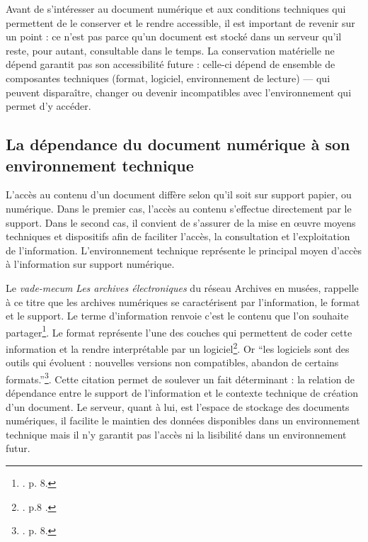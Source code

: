 Avant de s’intéresser au document numérique et aux conditions techniques qui permettent de le conserver et le rendre accessible, il est important de revenir sur un point : ce n'est pas parce qu'un document est stocké dans un serveur qu'il reste, pour autant, consultable dans le temps. La conservation matérielle ne dépend garantit pas son accessibilité future : celle-ci dépend de ensemble de composantes techniques (format, logiciel, environnement de lecture) — qui peuvent disparaître, changer ou devenir incompatibles avec l'environnement qui permet d'y accéder. 

\subsection*{La dépendance du document numérique à son environnement technique}

L'accès au contenu d'un document diffère selon qu'il soit sur support papier, ou numérique. Dans le premier cas, l'accès au contenu  s'effectue directement par le support. Dans le second cas, il convient de s’assurer de la  mise en œuvre moyens techniques et dispositifs afin de faciliter l'accès, la consultation et l'exploitation de l'information. L'environnement technique représente le principal moyen d'accès à l'information sur support numérique. 

Le \textit{vade-mecum} \textit{Les archives électroniques} du réseau Archives en musées, rappelle à ce titre que les archives numériques se caractérisent par l'information, le format et le support. Le terme d'information renvoie c'est le contenu que l'on souhaite partager\footnote{\cite{archives-en-musees-electroniques}. p. 8.}. Le format représente l'une des couches qui permettent de coder cette information et la rendre interprétable par un logiciel\footnote{\cite{archives-en-musees-electroniques}. p.8 .}. Or \enquote{les logiciels sont des outils qui évoluent : nouvelles versions non compatibles, abandon de certains formats.}\footnote{\cite{archives-en-musees-electroniques}. p. 8.}. Cette citation permet de soulever un fait déterminant : la relation de dépendance entre le support de l'information et le contexte technique de création d'un document. Le serveur, quant à lui, est l'espace de stockage des documents numériques, il facilite le maintien des données disponibles dans un environnement technique mais il n'y garantit pas l'accès ni la lisibilité dans un environnement futur.

